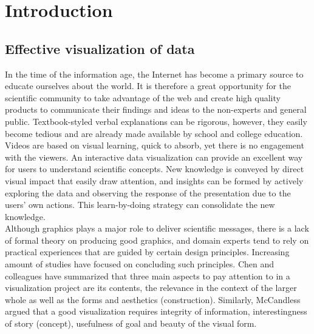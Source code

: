 \documentclass[11pt, a4paper,oneside,chapterprefix=false]{scrbook}
\begin{document}
\tableofcontents

\mainmatter


\chapter{Introduction} \label{chp:introduction}

\section{Effective visualization of data} \label{sec:one}
In the time of the information age, the Internet has become a primary source to educate ourselves about the world. It is therefore a great opportunity for the scientific community to take advantage of the web and create high quality products to communicate their findings and ideas to the non-experts and general public. Textbook-styled verbal explanations can be rigorous, however, they easily become tedious and are already made available by school and college education. Videos are based on visual learning, quick to absorb, yet there is no engagement with the viewers. An interactive data visualization can provide an excellent way for users to understand scientific concepts. New knowledge is conveyed by direct visual impact that easily draw attention, and insights can be formed by actively exploring the data and observing the response of the presentation due to the users' own actions. This learn-by-doing strategy can consolidate the new knowledge. \\

Although graphics plays a major role to deliver scientific messages, there is a lack of formal theory on producing good graphics, and domain experts tend to rely on practical experiences that are guided by certain design principles. Increasing amount of studies have focused on concluding such principles. Chen and colleagues have summarized that three main aspects to pay attention to in a visualization project are its contents, the relevance in the context of the larger whole as well as the forms and aesthetics (construction). Similarly, McCandless argued that a good visualization requires integrity of information, interestingness of story (concept), usefulness of goal and beauty of the visual form.\\
\end{document}
